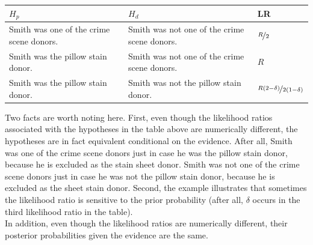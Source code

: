\documentclass[
  10pt,
  dvipsnames,enabledeprecatedfontcommands]{scrartcl}
\begin{document}
\begin{center}
    \footnotesize
    \begin{tabular}{@{}p{5cm}p{5cm}l@{}}
        \toprule
        $H_p$ & $H_d$  & LR \\ \midrule
        Smith was one of the crime scene donors.   &  Smith was not one of the crime scene donors. & $\nicefrac{R}{2}$   \\
        Smith was the pillow stain donor.     & Smith was not one of the crime scene donors.& $R$\\
        Smith was the pillow stain donor. & Smith was not the pillow stain donor. &  $\nicefrac{R(2-\delta)}{2(1-\delta)}$
        \\ \bottomrule
    \end{tabular}
\end{center}
\normalsize
\vspace{2mm}

\noindent Two facts are worth noting here. First, even though the
likelihood ratios associated with the hypotheses in the table above are
numerically different, the hypotheses are in fact equivalent conditional
on the evidence. After all, Smith was one of the crime scene donors just
in case he was the pillow stain donor, because he is excluded as the
stain sheet donor. Smith was not one of the crime scene donors just in
case he was not the pillow stain donor, because he is excluded as the
sheet stain donor. Second, the example illustrates that sometimes the
likelihood ratio is sensitive to the prior probability (after all,
\(\delta\) occurs in the third likelihood ratio in the table).\\
In addition, even though the likelihood ratios are numerically
different, their posterior probabilities given the evidence are the
same.
\end{document}
